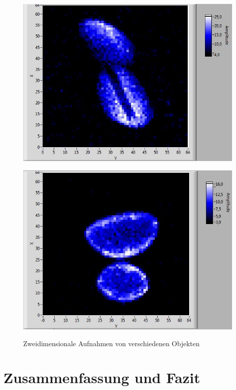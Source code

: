 \documentclass[a4paper]{scrartcl} %
\begin{document}
\begin{figure}[htbp]
{	\parbox{0.48\textwidth}{
		\centering
		\includegraphics[width=1.0 \linewidth]{./Resources/Teil_3/peanut_shell.JPG}
		\label{fig:2d_erdnuss}}
	\hfill  
	\parbox{0.48\textwidth}{
		\centering
		\includegraphics[width=1.0 \linewidth]{./Resources/Teil_3/aloevera_2d.JPG}
		\label{fig:2d_aloevera}}
		
		}	
		\caption{Zweidimensionale Aufnahmen von verschiedenen Objekten}
		\label{fig:2d_main}
	
\end{figure}


\section{Zusammenfassung und Fazit}

\printbibliography
\end{document}
